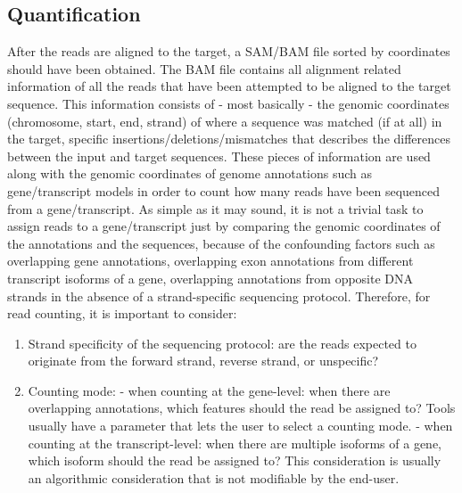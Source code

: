 \documentclass[12pt,]{krantz}
\providecommand{\tightlist}{%
  \setlength{\itemsep}{0pt}\setlength{\parskip}{0pt}}
\begin{document}
\hypertarget{quantification}{%
\subsection{Quantification}\label{quantification}}

After the reads are aligned to the target, a SAM/BAM file sorted by coordinates should have been obtained. The BAM file contains all alignment related information of all the reads that have been attempted to be aligned to the target sequence. This information consists of - most basically - the genomic coordinates (chromosome, start, end, strand) of where a sequence was matched (if at all) in the target, specific insertions/deletions/mismatches that describes the differences between the input and target sequences. These pieces of information are used along with the genomic coordinates of genome annotations such as gene/transcript models in order to count how many reads have been sequenced from a gene/transcript. As simple as it may sound, it is not a trivial task to assign reads to a gene/transcript just by comparing the genomic coordinates of the annotations and the sequences, because of the confounding factors such as overlapping gene annotations, overlapping exon annotations from different transcript isoforms of a gene, overlapping annotations from opposite DNA strands in the absence of a strand-specific sequencing protocol. Therefore, for read counting, it is important to consider:

\begin{enumerate}
\def\labelenumi{\arabic{enumi}.}
\tightlist
\item
  Strand specificity of the sequencing protocol: are the reads expected to originate from the forward strand, reverse strand, or unspecific?
\item
  Counting mode:
  - when counting at the gene-level: when there are overlapping annotations, which features should the read be assigned to? Tools usually have a parameter that lets the user to select a counting mode.
  - when counting at the transcript-level: when there are multiple isoforms of a gene, which isoform should the read be assigned to? This consideration is usually an algorithmic consideration that is not modifiable by the end-user.
\end{enumerate}
\end{document}
